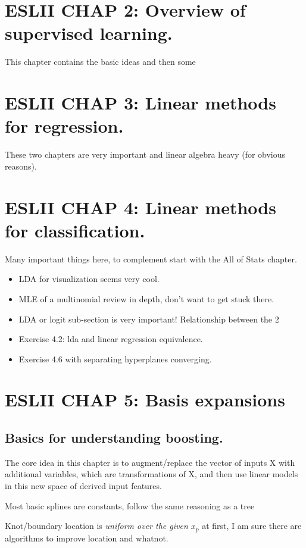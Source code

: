 \documentclass{article}
\begin{document}
\section*{ESLII CHAP 2: Overview of supervised learning.}
This chapter contains the basic ideas and then some 

\section*{ESLII CHAP 3: Linear methods for regression.}
These two chapters are very important and linear algebra heavy (for obvious reasons).
\section*{ESLII CHAP 4: Linear methods for classification.}
Many important things here, to complement start with the All of Stats chapter. 

\begin{itemize}
    \item LDA for visualization seems very cool.
    \item MLE of a multinomial review in depth, don't want to get stuck there.
    \item LDA or logit sub-section is very important! Relationship between the 2
    \item Exercise 4.2: lda and linear regression equivalence.
    \item Exercise 4.6 with separating hyperplanes converging.
\end{itemize}


\section*{ESLII CHAP 5: Basis expansions}

\subsection*{Basics for understanding boosting.}
The core idea in this chapter is to augment/replace the
vector of inputs X with additional variables, which are transformations of
X, and then use linear models in this new space of derived input features.

Most basic splines are constants, follow the same reasoning as a tree 

Knot/boundary location is \textit{uniform over the given $x_p$} at first, I am sure there are algorithms to improve location and whatnot.
\end{document}

